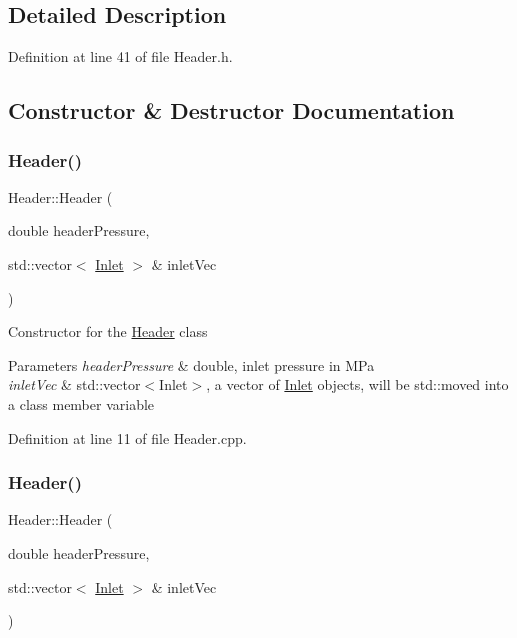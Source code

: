 \subsection{Detailed Description}


Definition at line 41 of file Header.\+h.



\subsection{Constructor \& Destructor Documentation}
\mbox{\label{class_header_a59b836abde0be58bec65ebea1ac67a3b}} 
\subsubsection{\texorpdfstring{Header()}{Header()}\hspace{0.1cm}{\footnotesize\ttfamily [1/3]}}
{\footnotesize\ttfamily Header\+::\+Header (\begin{DoxyParamCaption}\item[{double}]{header\+Pressure,  }\item[{std\+::vector$<$ \hyperlink{class_inlet}{Inlet} $>$ \&}]{inlet\+Vec }\end{DoxyParamCaption})}

Constructor for the \hyperlink{class_header}{Header} class


\begin{DoxyParams}{Parameters}
{\em header\+Pressure} & double, inlet pressure in M\+Pa \\
\hline
{\em inlet\+Vec} & std\+::vector$<$\+Inlet$>$, a vector of \hyperlink{class_inlet}{Inlet} objects, will be std\+::moved into a class member variable \\
\hline
\end{DoxyParams}


Definition at line 11 of file Header.\+cpp.

\mbox{\label{class_header_a59b836abde0be58bec65ebea1ac67a3b}} 
\subsubsection{\texorpdfstring{Header()}{Header()}\hspace{0.1cm}{\footnotesize\ttfamily [2/3]}}
{\footnotesize\ttfamily Header\+::\+Header (\begin{DoxyParamCaption}\item[{double}]{header\+Pressure,  }\item[{std\+::vector$<$ \hyperlink{class_inlet}{Inlet} $>$ \&}]{inlet\+Vec }\end{DoxyParamCaption})}

